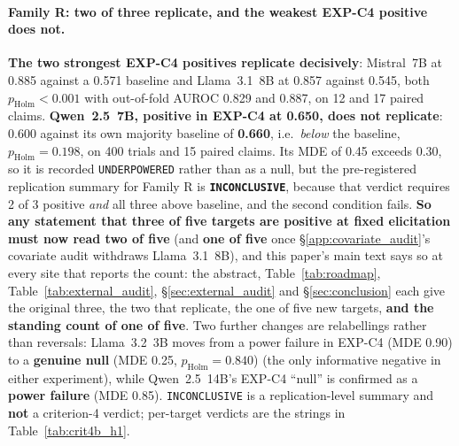\paragraph{Family R: two of three replicate, and the weakest EXP-C4 positive does not.} \textbf{The two strongest EXP-C4 positives replicate decisively}: Mistral~7B at 0.885 against a 0.571 baseline and Llama~3.1~8B at 0.857 against 0.545, both $p_{\mathrm{Holm}}\!<\!0.001$ with out-of-fold AUROC 0.829 and 0.887, on 12 and 17 paired claims. \textbf{Qwen~2.5~7B, positive in EXP-C4 at 0.650, does not replicate}: 0.600 against its own majority baseline of \textbf{0.660}, i.e.\ \emph{below} the baseline, $p_{\mathrm{Holm}}\!=\!0.198$, on 400 trials and 15 paired claims. Its MDE of 0.45 exceeds 0.30, so it is recorded \texttt{UNDERPOWERED} rather than as a null, but the pre-registered replication summary for Family R is \textbf{\texttt{INCONCLUSIVE}}, because that verdict requires 2 of 3 positive \emph{and} all three above baseline, and the second condition fails. \textbf{So any statement that three of five targets are positive at fixed elicitation must now read two of five} (and \textbf{one of five} once §\ref{app:covariate_audit}'s covariate audit withdraws Llama~3.1~8B), and this paper's main text says so at every site that reports the count: the abstract, Table~\ref{tab:roadmap}, Table~\ref{tab:external_audit}, §\ref{sec:external_audit} and §\ref{sec:conclusion} each give the original three, the two that replicate, the one of five new targets, \textbf{and the standing count of one of five}. Two further changes are relabellings rather than reversals: Llama~3.2~3B moves from a power failure in EXP-C4 (MDE 0.90) to a \textbf{genuine null} (MDE 0.25, $p_{\mathrm{Holm}}\!=\!0.840$) (the only informative negative in either experiment), while Qwen~2.5~14B's EXP-C4 ``null'' is confirmed as a \textbf{power failure} (MDE 0.85). \texttt{INCONCLUSIVE} is a replication-level summary and \textbf{not} a criterion-4 verdict; per-target verdicts are the strings in Table~\ref{tab:crit4b_h1}.

